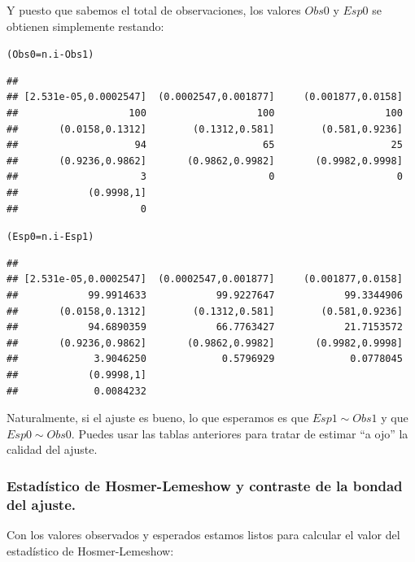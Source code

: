 \documentclass[10pt,a4paper]{article}\usepackage[]{graphicx}\usepackage[]{color}
\makeatletter
\newcommand{\hlopt}[1]{\textcolor[rgb]{0,0,0}{#1}}%
\newcommand{\hlstd}[1]{\textcolor[rgb]{0.345,0.345,0.345}{#1}}%
\newcommand{\hlkwb}[1]{\textcolor[rgb]{0.69,0.353,0.396}{#1}}%
\newenvironment{kframe}{%
 \def\at@end@of@kframe{}%
 \ifinner\ifhmode%
  \def\at@end@of@kframe{\end{minipage}}%
  \begin{minipage}{\columnwidth}%
 \fi\fi%
 \def\FrameCommand##1{\hskip\@totalleftmargin \hskip-\fboxsep
 \colorbox{shadecolor}{##1}\hskip-\fboxsep
     \hskip-\linewidth \hskip-\@totalleftmargin \hskip\columnwidth}%
 \MakeFramed {\advance\hsize-\width
   \@totalleftmargin\z@ \linewidth\hsize
   \@setminipage}}%
 {\par\unskip\endMakeFramed%
 \at@end@of@kframe}
\newenvironment{knitrout}{}{} %
\newcounter {cont01}
\makeatother
\begin{document}
Y puesto que sabemos el total de observaciones, los valores $Obs0$ y $Esp0$ se obtienen simplemente restando:

\begin{knitrout}
\color{fgcolor}\begin{kframe}
\begin{alltt}
\hlstd{(Obs0} \hlkwb{=} \hlstd{n.i} \hlopt{-} \hlstd{Obs1)}
\end{alltt}
\begin{verbatim}
## 
## [2.531e-05,0.0002547]  (0.0002547,0.001877]     (0.001877,0.0158] 
##                   100                   100                   100 
##       (0.0158,0.1312]        (0.1312,0.581]        (0.581,0.9236] 
##                    94                    65                    25 
##       (0.9236,0.9862]       (0.9862,0.9982]       (0.9982,0.9998] 
##                     3                     0                     0 
##            (0.9998,1] 
##                     0
\end{verbatim}
\begin{alltt}
\hlstd{(Esp0} \hlkwb{=} \hlstd{n.i} \hlopt{-}\hlstd{Esp1)}
\end{alltt}
\begin{verbatim}
## 
## [2.531e-05,0.0002547]  (0.0002547,0.001877]     (0.001877,0.0158] 
##            99.9914633            99.9227647            99.3344906 
##       (0.0158,0.1312]        (0.1312,0.581]        (0.581,0.9236] 
##            94.6890359            66.7763427            21.7153572 
##       (0.9236,0.9862]       (0.9862,0.9982]       (0.9982,0.9998] 
##             3.9046250             0.5796929             0.0778045 
##            (0.9998,1] 
##             0.0084232
\end{verbatim}
\end{kframe}
\end{knitrout}




Naturalmente, si el ajuste es bueno, lo que esperamos es que $Esp1 \sim Obs1$ y que $Esp0\sim Obs0$. Puedes usar las tablas anteriores para tratar de estimar ``a ojo'' la calidad del ajuste.

\subsubsection*{Estadístico de Hosmer-Lemeshow y contraste de la bondad del ajuste.}

Con los valores observados y esperados estamos listos para calcular el valor del estadístico de Hosmer-Lemeshow:
\end{document}
